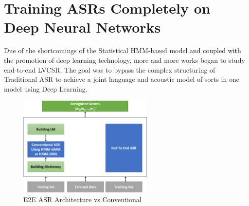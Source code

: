 




\section{Training ASRs Completely on Deep Neural Networks}

Due of the shortcomings of the Statistical HMM-based model and coupled with the promotion of deep learning technology, more and more works began to study end-to-end LVCSR. The goal was to bypass the complex structuring of Traditional ASR to achieve a joint language and acoustic model of sorts in one model using Deep Learning.

\begin{figure}[h]
    \centering
    \includegraphics[width=0.6\textwidth]{img/E2EvsConventional.png}
    \caption{E2E ASR Architecture vs Conventional}
    \label{fig:e2e-asr}
\end{figure}

